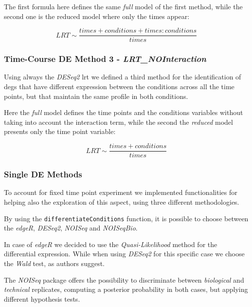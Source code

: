 The first formula here defines the same \textit{full} model of the first method, while the second one is the reduced model where only the times appear:

\[LRT \sim \frac{times+conditions+times:conditions}{times}\]


\subsubsection{Time-Course DE Method 3 - \textit{LRT\_NOInteraction}}
Using always the \textit{DESeq2} \gls{lrt} we defined a third method for the 
identification of \glspl{deg} that have different expression between the conditions across all the time points, but that maintain the same profile in both conditions.

Here the \textit{full} model defines the time points and the conditions variables without taking into account the interaction term, while the second the \textit{reduced} model presents only the time point variable:

\[LRT \sim \frac{times+conditions}{times}\]


%


\subsubsection{Single DE Methods}

To account for fixed time point experiment we implemented functionalities for helping also the exploration of this aspect, using three different methodologies.
 

By using the \lstinline!differentiateConditions! function, it is possible to choose between the \textit{edgeR}, \textit{DESeq2}, \textit{NOISeq} and \textit{NOISeqBio}.

In case of \textit{edgeR} we decided to use the \textit{Quasi-Likelihood} method for the differential expression.
While when using \textit{DESeq2} for this specific case we choose the \textit{Wald} test, as authors suggest.

The \textit{NOISeq} package offers the possibility to discriminate between \textit{biological} and \textit{technical} replicates, computing a posterior probability in both cases, but applying different hypothesis tests.




